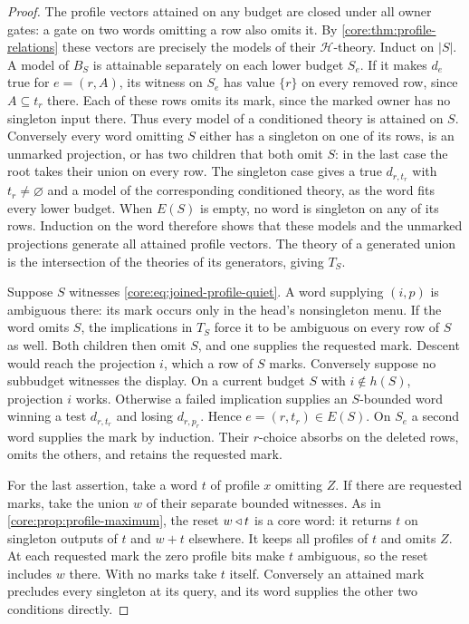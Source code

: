 \begin{proof}
The profile vectors attained on any budget are closed under all owner
gates: a gate on two words omitting a row also omits it.
By \cref{core:thm:profile-relations} these vectors are precisely the
models of their $\mathcal H$-theory. Induct on $|S|$. A model of $B_S$
is attainable separately on each lower budget $S_e$. If it makes
$d_e$ true for $e=(r,A)$, its witness on $S_e$ has value $\{r\}$
on every removed row, since $A\subseteq t_r$ there. Each of these
rows omits its mark, since the marked owner has no singleton input
there. Thus every model of a conditioned theory is attained on $S$.
Conversely every word omitting $S$ either has a singleton on one of its
rows, is an unmarked projection, or has two children that both omit
$S$: in the last case the root takes their union on every row.
The singleton case gives a true $d_{r,t_r}$ with $t_r\ne\varnothing$
and a model of the corresponding conditioned theory, as the word fits
every lower budget. When $E(S)$ is empty, no word is singleton on
any of its rows. Induction on the word
therefore shows that these models and the unmarked projections generate
all attained profile vectors. The theory of a generated union is the
intersection of the theories of its generators, giving $T_S$.

Suppose $S$ witnesses \eqref{core:eq:joined-profile-quiet}. A word
supplying $(i,p)$ is ambiguous there: its mark occurs only in the
head's nonsingleton menu. If the word omits $S$, the implications in
$T_S$ force it to be ambiguous on every row of $S$ as well. Both
children then omit $S$, and one supplies the requested mark. Descent
would reach the projection $i$, which a row of $S$ marks.
Conversely suppose no subbudget witnesses the display. On a current
budget $S$ with $i\notin h(S)$, projection $i$ works. Otherwise a
failed implication supplies an $S$-bounded word winning a test
$d_{r,t_r}$ and losing $d_{r,p_r}$. Hence $e=(r,t_r)\in E(S)$.
On $S_e$ a second word supplies the mark by induction.
Their $r$-choice absorbs on the deleted
rows, omits the others, and retains the requested mark.

For the last assertion, take a word $t$ of profile $x$ omitting $Z$.
If there are requested marks, take the union $w$ of their separate
bounded witnesses. As in \cref{core:prop:profile-maximum}, the reset
$w\mathbin{\triangleleft} t$ is a core word: it returns $t$ on singleton outputs of $t$
and $w+t$ elsewhere. It keeps all profiles of $t$ and
omits $Z$. At each requested mark the zero profile bits make $t$
ambiguous, so the reset includes $w$ there. With no marks take $t$
itself. Conversely an attained mark precludes every singleton at its
query, and its word supplies the other two conditions directly.
\end{proof}

